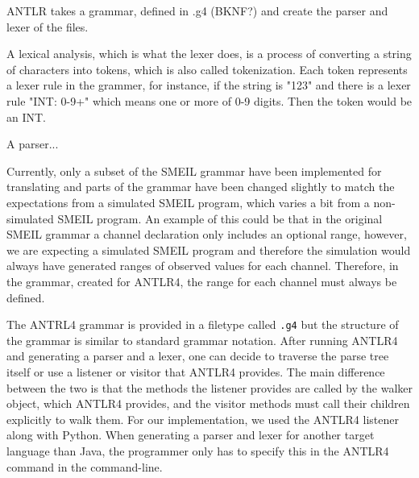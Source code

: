ANTLR takes a grammar, defined in .g4 (BKNF?) and create the parser and lexer of the files.

A lexical analysis, which is what the lexer does, is a process of converting a string of characters into tokens, which is also called tokenization. Each token represents a lexer rule in the grammer, for instance, if the string is "123" and there is a lexer rule "INT: {0-9}+" which means one or more of 0-9 digits. Then the token would be an INT.

A parser...%

Currently, only a subset of the SMEIL grammar have been implemented for translating and parts of the grammar have been changed slightly to match the expectations from a simulated SMEIL program, which varies a bit from a non-simulated SMEIL program. An example of this could be that in the original SMEIL grammar a channel declaration only includes an optional range, however, we are expecting a simulated SMEIL program and therefore the simulation would always have generated ranges of observed values for each channel. Therefore, in the grammar, created for ANTLR4, the range for each channel must always be defined.

The ANTRL4 grammar is provided in a filetype called \texttt{.g4} but the structure of the grammar is similar to standard grammar notation.
After running ANTLR4 and generating a parser and a lexer, one can decide to traverse the parse tree itself or use a listener or visitor that ANTLR4 provides. The main difference between the two is that the methods the listener provides are called by the walker object, which ANTLR4 provides, and the visitor methods must call their children explicitly to walk them.
For our implementation, we used the ANTLR4 listener along with Python. When generating a parser and lexer for another target language than Java, the programmer only has to specify this in the ANTLR4 command in the command-line.
